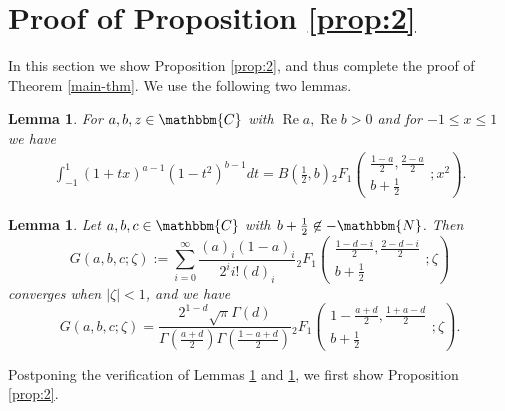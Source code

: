 \documentclass[12pt]{article}
\numberwithin{equation}{section}
\newcommand{\assign}{:=}
\newcommand{\nin}{\not\in}
\newcommand{\tmop}[1]{\ensuremath{\operatorname{#1}}}
\newtheorem{lemma}[corollary]{Lemma}
\newcommand{\mygrammarfootnote}[1]{}
\begin{document}
\section{Proof of Proposition \ref{prop:2}}\label{sec:3}

In this section we show Proposition \ref{prop:2}, and thus complete the proof
of Theorem \ref{main-thm}. We use the following two lemmas.

\begin{lemma}
  \label{lem4}For $a, b, z \in \mathbbm{C}$ with $\tmop{Re} a, \tmop{Re} b >
  0$ and for $- 1 \leqslant x \leqslant 1$ we have
  \begin{eqnarray}
    & \displaystyle\int_{- 1}^1 (1 + tx)^{a - 1} (1 - t^2)^{b - 1} d t = B \left(
    \frac{1}{2}, b \right){}_2 F_1 \left( \begin{array}{c}
      \frac{1 - a}{2}, \frac{2 - a}{2}\\
      b + \frac{1}{2}
    \end{array} ; x^2 \right) . &  \nonumber
  \end{eqnarray}
\end{lemma}

\begin{lemma}
  \label{lem:Fisum}Let $a, b, c \in \mathbbm{C}$ with $b + \frac{1}{2} \nin
  -\mathbbm{N}$. Then\mygrammarfootnote{maybe, we need a comma here?}
  \[ G (a, b, c ; \zeta) \assign \displaystyle\sum_{i = 0}^{\infty} \frac{(a)_i (1 -
     a)_i}{2^i i! (d)_i}{}_2 F_1 \left( \begin{array}{c}
       \frac{1 - d - i}{2}, \frac{2 - d - i}{2}\\
       b + \frac{1}{2}
     \end{array} ; \zeta \right) \]
  converges when $| \zeta | < 1$, and we have
  \begin{equation} G (a, b, c ; \zeta) = \frac{2^{1 - d} \sqrt{\pi} \Gamma (d)}{\Gamma
     \left( \frac{a + d}{2} \right) \Gamma \left( \frac{1 - a + d}{2} \right)}
    {}_2 F_1 \left( \begin{array}{c}
       1 - \frac{a + d}{2}, \frac{1 + a - d}{2}\\
       b + \frac{1}{2}
   \end{array} ; \zeta \right) .  \label{eqn:iF}\end{equation}
\end{lemma}

Postponing the verification of Lemmas \ref{lem4} and \ref{lem:Fisum}, we first
show Proposition \ref{prop:2}.
\end{document}
